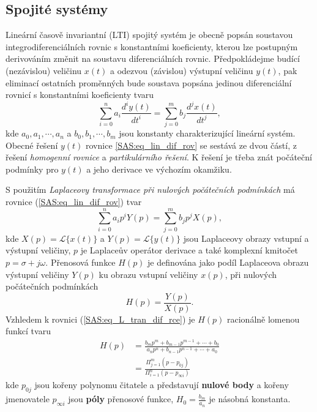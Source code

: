     \subsection{Spojité systémy}
      Lineární časově invariantní (LTI) spojitý systém je obecně popsán soustavou
      integrodiferenciálních rovnic s konstantními koeficienty, kterou lze postupným derivováním
      změnit na soustavu diferenciálních rovnic. Předpokládej\-me budící (ne\-zá\-vis\-lou) veličinu
      $x(t)$ a odezvou (závislou) výstupní veličinu $y(t)$, pak eliminací ostatních proměnných bude 
      soustava popsána jedinou diferenciální rovnicí s konstantními koeficienty tvaru
      \begin{equation}\label{SAS:eq_lin_dif_rov}
          \sum_{i=0}^na_i\frac{d^iy(t)}{dt^i}=\sum_{j=0}^mb_j\frac{d^jx(t)}{dt^j},
      \end{equation}
      kde $a_0, a_1, \cdots ,a_n$ a $b_0, b_1, \cdots ,b_m$ jsou konstanty charakterizující lineární
      systém. Obecné řešení $y(t)$ rovnice \ref{SAS:eq_lin_dif_rov} se sestává ze dvou částí, z 
      řešení \emph{homogenní rovnice} a \emph{partikulárního řešení}. K řešení je třeba znát 
      počáteční podmínky pro $y(t)$ a jeho derivace ve výchozím okamžiku.
  
      S použitím \emph{Laplaceovy transformace při nulových počátečních podmínkách} má rovnice
      (\ref{SAS:eq_lin_dif_rov}) tvar
      \begin{equation}\label{SAS:eq_L_tran_dif_rce}
        \sum_{i=0}^na_ip^iY(p)=\sum_{j=0}^mb_jp^jX(p),
      \end{equation}
      kde $X(p)=\mathcal{L}\{x(t)\}$ a $Y(p)=\mathcal{L}\{y(t)\}$ jsou Laplaceovy obrazy vstupní a
      výstupní veličiny, $p$ je Laplaceův operátor derivace a také komplexní kmitočet 
      $p=\sigma+j\omega$. Přenosová funkce $H(p)$ je definována jako podíl Laplaceova obrazu 
      výstupní veličiny $Y(p)$ ku obrazu vstupní veličiny $x(p)$, při nulových počátečních 
      podmínkách
      \begin{equation}\label{SAS:eq_Hp_popis}
          H(p)=\frac{Y(p)}{X(p)}.
      \end{equation}
      Vzhledem k rovnici (\ref{SAS:eq_L_tran_dif_rce}) je $H(p)$ racionálně lomenou funkcí tvaru
      \begin{align}
        H(p)&=\frac{b_mp^m+b_{m-1}p^{m-1}+\cdots+b_0}{a_np^n+b_{n-1}p^{n-1}+\cdots+a_0}  \nonumber\\
            &=\frac{\Pi_{j=1}^m(p-p_{0j})}{\Pi_{i=1}^n(p-p_{\infty i})}            \label{tky:eq002}
      \end{align}
      kde $p_{0j}$ jsou kořeny polynomu čitatele a představují \textbf{nulové body} a kořeny
      jmenovatele $p_{\infty i}$ jsou \textbf{póly} přenosové funkce, $H_0=\frac{b_m}{a_n}$ je
      násobná konstanta.
  

